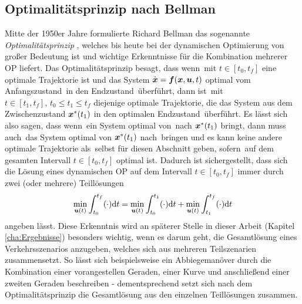 \subsection{Optimalitätsprinzip nach Bellman}\label{subsec:Optimalitätsprinzip}
Mitte der 1950er Jahre formulierte Richard Bellman das sogenannte \textit{Optimalitätsprinzip} \cite{Bellman.1984}, welches bis heute bei der dynamischen Optimierung von großer Bedeutung ist und wichtige Erkenntnisse für die Kombination mehrerer \gls{OP} liefert. Das Optimalitätsprinzip besagt, dass wenn \uoptoft\,mit $t\in[t_0, t_f]$ eine optimale Trajektorie ist und das System $\dot{\boldsymbol{x}} = \boldsymbol{f}(\boldsymbol{x},\boldsymbol{u},t)$ optimal vom Anfangszustand \xoftzero\,in den Endzustand \xoptoftf\,überführt, dann ist \uoptoft\,mit $t\in[t_1, t_f],\, t_0\leq t_1\leq t_f$ diejenige optimale Trajektorie, die das System aus dem Zwischenzustand ${\boldsymbol{x}}^*(t_1)$ in den optimalen Endzustand \xoptoftf\,überführt. Es lässt sich also sagen, dass wenn \uoptoft\,ein System optimal von \xoftzero\,nach ${\boldsymbol{x}}^*(t_1)$ bringt, dann muss auch \uoptoft\,das System optimal von ${\boldsymbol{x}}^*(t_1)$ nach \xoptoftf\,bringen und es kann keine andere optimale Trajektorie als \uoptoft\,selbst für diesen Abschnitt geben, sofern \uoptoft\,auf dem gesamten Intervall $t\in[t_0, t_f]$ optimal ist. Dadurch ist sichergestellt, dass sich die Lösung eines dynamischen \gls{OP} auf dem Intervall $t\in[t_0, t_f]$ immer durch zwei (oder mehrere) Teillösungen 
\begin{equation}
	\min_{\boldsymbol{u}(t)} \int_{t_0}^{t_f}(\cdot)\textrm{d}{t} = \min_{\boldsymbol{u}(t)} \int_{t_0}^{t_1}(\cdot)\textrm{d}{t} + \min_{\boldsymbol{u}(t)} \int_{t_1}^{t_f}(\cdot)\textrm{d}{t}
\end{equation}
angeben lässt. Diese Erkenntnis wird an späterer Stelle in dieser Arbeit (Kapitel \ref{cha:Ergebnisse}) besonders wichtig, wenn es darum geht, die Gesamtlösung eines Verkehrsszenarios anzugeben, welches sich aus mehreren Teilszenarien zusammensetzt. So lässt sich beispielsweise ein Abbiegemanöver durch die Kombination einer vorangestellen Geraden, einer Kurve und anschließend einer zweiten Geraden beschreiben - dementsprechend setzt sich nach dem Optimalitätsprinzip die Gesamtlösung aus den einzelnen Teillösungen zusammen.
